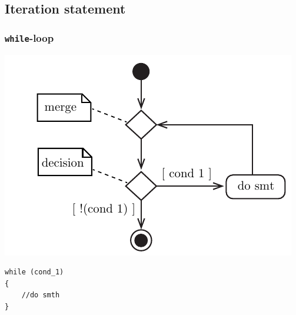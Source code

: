 \subsection{Iteration statement}
\subsubsection{\texttt{while}-loop}
\begin{minipage}{.50\textwidth}
\centering
\includegraphics[width=0.80\linewidth]{01_Basics/figures/uml/IterationStatement-00-UML-while.pdf}
\label{fig:ch01_Basics_UML_IterationStatement-00-while}
\end{minipage}
\begin{minipage}{.25\textwidth}
\begin{lstlisting}[frame=tlrb,numbers=none,mathescape=true,escapechar=\%,columns=flexible]
while (cond_1)
{
    //do smth
}
\end{lstlisting}
\end{minipage}
\vspace{0.5cm}

